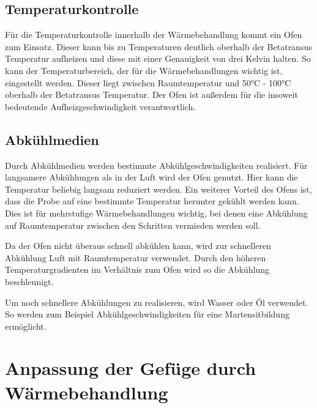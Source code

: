 \documentclass[a4paper, 11pt]{tubsreprt}
\begin{document}
\subsection{Temperaturkontrolle}
Für die Temperaturkontrolle innerhalb der Wärmebehandlung kommt ein Ofen zum Einsatz. Dieser kann bis zu Temperaturen deutlich oberhalb der Betatransus Temperatur aufheizen und diese mit einer Genauigkeit von drei Kelvin halten. So kann der Temperaturbereich, der für die Wärmebehandlungen wichtig ist, eingestellt werden. Dieser liegt zwischen Raumtemperatur und 50°C - 100°C oberhalb der Betatransus Temperatur. Der Ofen ist außerdem für die insoweit bedeutende Aufheizgeschwindigkeit verantwortlich.

\subsection{Abkühlmedien}

Durch Abkühlmedien werden bestimmte Abkühlgeschwindigkeiten realisiert. Für langsamere Abkühlungen als in der Luft wird der Ofen genutzt. Hier kann die Temperatur beliebig langsam reduziert werden. Ein weiterer Vorteil des Ofens ist, dass die Probe auf eine bestimmte Temperatur herunter gekühlt werden kann. Dies ist für mehrstufige Wärmebehandlungen wichtig, bei denen eine Abkühlung auf Raumtemperatur zwischen den Schritten vermieden werden soll. 

Da der Ofen nicht überaus schnell abkühlen kann, wird zur schnelleren Abkühlung Luft mit Raumtemperatur verwendet. Durch den höheren Temperaturgradienten im Verhältnis zum Ofen wird so die Abkühlung beschleunigt.  

Um noch schnellere Abkühlungen zu realisieren, wird Wasser oder Öl verwendet. So werden zum Beispiel Abkühlgeschwindigkeiten für eine Martensitbildung ermöglicht.
\section{Anpassung der Gefüge durch Wärmebehandlung}
\end{document}
